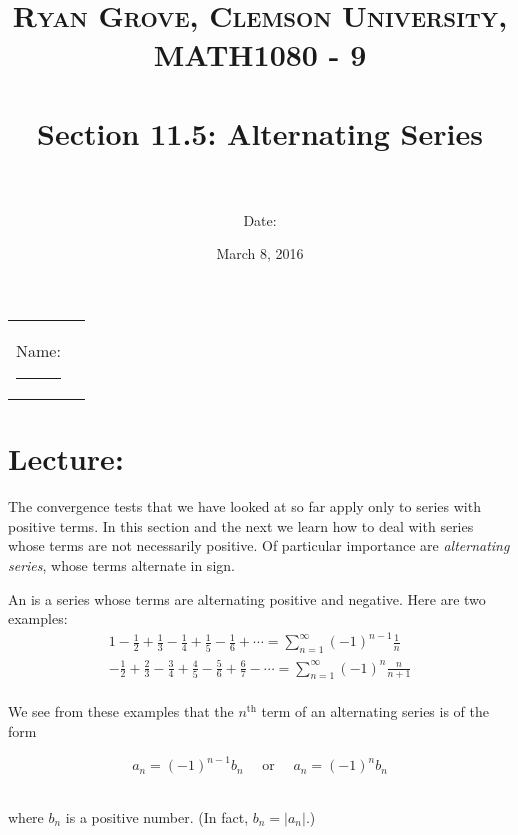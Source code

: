 \documentclass[paper=a4, fontsize=11pt]{scrartcl} %
\title{	
\normalfont \normalsize 
\textsc{Ryan Grove, Clemson University, MATH1080 - 9} \\ [25pt] %
\horrule{0.5pt} \\[0.4cm] %
\huge Section 11.5: Alternating Series\\ %
\horrule{2pt} \\[0.5cm] %
}
\author{Date:} %
\date{\normalsize March 8, 2016} %
\numberwithin{equation}{section} %
\numberwithin{figure}{section} %
\numberwithin{table}{section} %
\newcommand{\ds}{\displaystyle}
\begin{document}
\maketitle %

\begin{flushleft}
\begin{tabular}{l l}
Name: \rule{3.2in}{.01cm}  & {}%
\end{tabular}
\end{flushleft}


\section*{\textbf{Lecture:}}
The convergence tests that we have looked at so far apply only to series with positive terms. In this section and the next we learn how to deal with series whose terms are not necessarily positive. Of particular importance are \textit{alternating series}, whose terms alternate in sign.\\
\indent

An \underline{\hspace{1.25in}} \underline{\hspace{1in}} is a series whose terms are alternating positive and negative. Here are two examples:
\begin{align*}
1 - \ds\frac{1}{2} + \ds\frac{1}{3} - \ds\frac{1}{4} + \ds\frac{1}{5} - \ds\frac{1}{6} + \cdots = \ds\sum_{n=1}^\infty (-1)^{n-1}\ds\frac{1}{n}\\
-\ds\frac{1}{2} + \ds\frac{2}{3} - \ds\frac{3}{4} + \ds\frac{4}{5} - \ds\frac{5}{6} + \ds\frac{6}{7} - \cdots = \ds\sum_{n=1}^\infty (-1)^n\ds\frac{n}{n+1}\\
\end{align*}

We see from these examples that the $n^{\text{th}}$ term of an alternating series is of the form

\[a_n = (-1)^{n-1}b_n \quad \text{ or } \quad a_n = (-1)^n b_n\]\\
\indent

where $b_n$ is a positive number. (In fact, $b_n=|a_n|$.)\\
\indent
\end{document}
